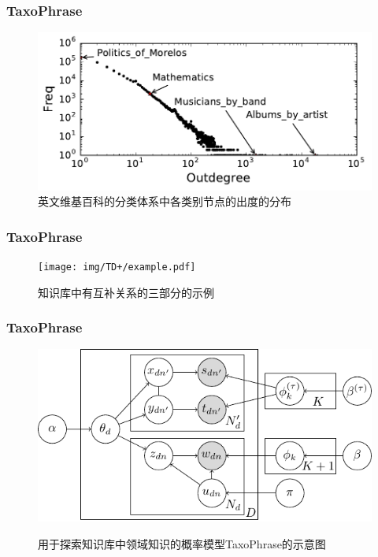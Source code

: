 \begin{frame}
\frametitle{TaxoPhrase}	
\begin{figure}
	\caption{英文维基百科的分类体系中各类别节点的出度的分布}
    \includegraphics[width=1.0\textwidth]{img/TD+/outdegree_distribution.pdf}
\end{figure}
\end{frame}

\begin{frame}
\frametitle{TaxoPhrase}	
\vspace{-5mm}
\begin{figure}
	\setlength{\abovecaptionskip}{0.cm}
	\setlength{\belowcaptionskip}{0.cm}
	\caption{知识库中有互补关系的三部分的示例}
    \texttt{[image: img/TD+/example.pdf]}
\end{figure}
\end{frame}

\begin{frame}
\frametitle{TaxoPhrase}
\begin{figure}
	\centering
	\caption{用于探索知识库中领域知识的概率模型TaxoPhrase的示意图}
    \includegraphics[width=0.8\columnwidth]{img/TD+/TaxoPhrase_inpaper.pdf}
	\label{fig:IllustrationTaxoPhrase}
\end{figure}
\end{frame}



